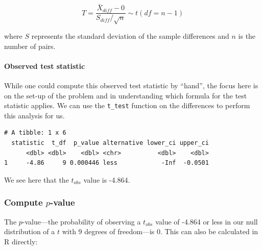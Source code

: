 \documentclass[12pt, krantz2,]{krantz}
\makeatletter
\newenvironment{Shaded}{\begin{snugshade}}{\end{snugshade}}
\newcommand{\DataTypeTok}[1]{\textcolor[rgb]{0.27,0.27,0.27}{#1}}
\newcommand{\DecValTok}[1]{\textcolor[rgb]{0.06,0.06,0.06}{#1}}
\newcommand{\KeywordTok}[1]{\textcolor[rgb]{0.27,0.27,0.27}{\textbf{#1}}}
\newcommand{\NormalTok}[1]{#1}
\newcommand{\OperatorTok}[1]{\textcolor[rgb]{0.43,0.43,0.43}{\textbf{#1}}}
\newcommand{\OtherTok}[1]{\textcolor[rgb]{0.37,0.37,0.37}{#1}}
\newcommand{\StringTok}[1]{\textcolor[rgb]{0.5,0.5,0.5}{#1}}
\let\oldparagraph\paragraph
\renewcommand{\paragraph}[1]{\oldparagraph{#1}\mbox{}}
\newenvironment{kframe}{%
\medskip{}
\setlength{\fboxsep}{.8em}
 \def\at@end@of@kframe{}%
 \ifinner\ifhmode%
  \def\at@end@of@kframe{\end{minipage}}%
  \begin{minipage}{\columnwidth}%
 \fi\fi%
 \def\FrameCommand##1{\hskip\@totalleftmargin \hskip-\fboxsep
 \colorbox{shadecolor}{##1}\hskip-\fboxsep
     \hskip-\linewidth \hskip-\@totalleftmargin \hskip\columnwidth}%
 \MakeFramed {\advance\hsize-\width
   \@totalleftmargin\z@ \linewidth\hsize
   \@setminipage}}%
 {\par\unskip\endMakeFramed%
 \at@end@of@kframe}
\renewenvironment{Shaded}{\begin{kframe}}{\end{kframe}}
\makeatother
\begin{document}
\[ T =\dfrac{ \bar{X}_{diff} - 0}{ S_{diff} / \sqrt{n} } \sim t (df = n - 1) \]

where \(S\) represents the standard deviation of the sample differences and \(n\) is the number of pairs.

\hypertarget{observed-test-statistic-4}{%
\paragraph{Observed test statistic}\label{observed-test-statistic-4}}

While one could compute this observed test statistic by ``hand'', the focus here is on the set-up of the problem and in understanding which formula for the test statistic applies. We can use the \texttt{t\_test} function on the differences to perform this analysis for us.

\begin{Shaded}
\end{Shaded}

\begin{verbatim}
# A tibble: 1 x 6
  statistic  t_df  p_value alternative lower_ci upper_ci
      <dbl> <dbl>    <dbl> <chr>          <dbl>    <dbl>
1     -4.86     9 0.000446 less            -Inf  -0.0501
\end{verbatim}

We see here that the \(t_{obs}\) value is -4.864.

\hypertarget{compute-p-value-2}{%
\subsubsection*{\texorpdfstring{Compute \(p\)-value}{Compute p-value}}\label{compute-p-value-2}}


The \(p\)-value---the probability of observing a \(t_{obs}\) value of -4.864 or less in our null distribution of a \(t\) with 9 degrees of freedom---is 0. This can also be calculated in R directly:
\end{document}

